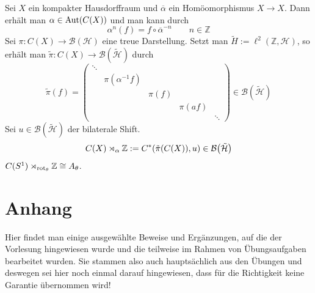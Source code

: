 \begin{beispiel}
	Sei $X$ ein kompakter Hausdorffraum und $\overline{\alpha}$ ein Homöomorphismus $X\to X$.
	Dann erhält man $\alpha \in \operatorname{Aut}(C(X))$ und man kann durch
	\[
		\alpha^n(f) = f \circ \overline{\alpha}^{-n} \qquad n \in \mathbb{Z}
	\]
	Sei $\pi \colon C(X) \to \mathcal{B}(\mathcal{H})$ eine treue Darstellung.
	Setzt man $\tilde{H} := \ell^2(\mathbb{Z},\mathcal{H})$, so erhält man $\tilde{\pi} \colon C(X) \to \mathcal{B}(\tilde{\mathcal{H}})$ durch
	\[
		\tilde{\pi}(f) = \begin{pmatrix}
			\ddots & & && \\
			& \pi(\alpha^{-1} f) & & &\\
			& & \pi(f) & &\\
			& & & \pi(a f) & \\
			& & & & \ddots
		\end{pmatrix} \in \mathcal{B}(\tilde{\mathcal{H}})
 	\]
	Sei $u \in \mathcal{B}(\tilde{\mathcal{H}})$ der bilaterale Shift.
	\[
		C(X) \rtimes_\alpha \mathbb{Z} := C^* \enbrace*{\tilde{\pi}(C(X)),u} \in \mathcal{B}\enbrace*{\tilde{\mathcal{H}}}
	\]
	$C(S^1) \rtimes_{\operatorname{rot}_\theta} \mathbb{Z} \cong A_\theta$.
\end{beispiel}











\cleardoubleoddemptypage
{}
\setcounter{page}{1}
\cleardoubleoddemptypage
\appendix

\section{Anhang} %
\label{sec:anhang}
Hier findet man einige ausgewählte Beweise und Ergänzungen, auf die der Vorlesung hingewiesen wurde und die teilweise im Rahmen von Übungsaufgaben bearbeitet wurden.
Sie stammen also auch hauptsächlich aus den Übungen und deswegen sei hier noch einmal darauf hingewiesen, dass für die Richtigkeit keine Garantie übernommen wird!


